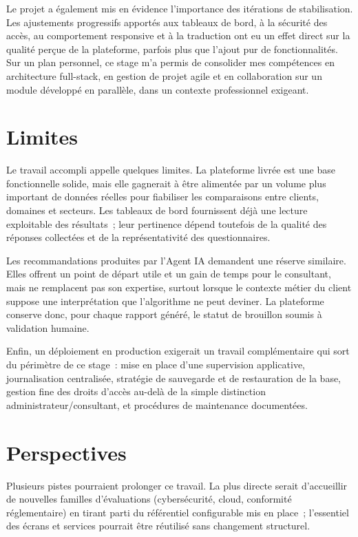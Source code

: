 \documentclass[12pt,a4paper]{report}
\begin{document}
Le projet a également mis en évidence l'importance des itérations de stabilisation. Les ajustements progressifs apportés aux tableaux de bord, à la sécurité des accès, au comportement responsive et à la traduction ont eu un effet direct sur la qualité perçue de la plateforme, parfois plus que l'ajout pur de fonctionnalités. Sur un plan personnel, ce stage m'a permis de consolider mes compétences en architecture full-stack, en gestion de projet agile et en collaboration sur un module développé en parallèle, dans un contexte professionnel exigeant.

\section*{Limites}
Le travail accompli appelle quelques limites. La plateforme livrée est une base fonctionnelle solide, mais elle gagnerait à être alimentée par un volume plus important de données réelles pour fiabiliser les comparaisons entre clients, domaines et secteurs. Les tableaux de bord fournissent déjà une lecture exploitable des résultats~; leur pertinence dépend toutefois de la qualité des réponses collectées et de la représentativité des questionnaires.

Les recommandations produites par l'Agent IA demandent une réserve similaire. Elles offrent un point de départ utile et un gain de temps pour le consultant, mais ne remplacent pas son expertise, surtout lorsque le contexte métier du client suppose une interprétation que l'algorithme ne peut deviner. La plateforme conserve donc, pour chaque rapport généré, le statut de brouillon soumis à validation humaine.

Enfin, un déploiement en production exigerait un travail complémentaire qui sort du périmètre de ce stage~: mise en place d'une supervision applicative, journalisation centralisée, stratégie de sauvegarde et de restauration de la base, gestion fine des droits d'accès au-delà de la simple distinction administrateur/consultant, et procédures de maintenance documentées.

\section*{Perspectives}
Plusieurs pistes pourraient prolonger ce travail. La plus directe serait d'accueillir de nouvelles familles d'évaluations (cybersécurité, cloud, conformité réglementaire) en tirant parti du référentiel configurable mis en place~; l'essentiel des écrans et services pourrait être réutilisé sans changement structurel.
\end{document}
